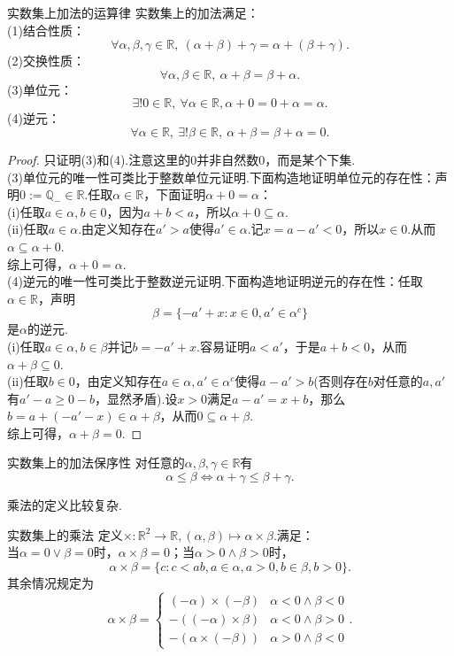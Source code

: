 \documentclass[lang=cn, zihao=5]{elegantbook}
\newcommand{\R}{\mathbb{R}}
\begin{document}
\begin{proposition}{实数集上加法的运算律}
	实数集上的加法满足： \\
	(1)结合性质：$$\forall \alpha ,\beta ,\gamma \in \R ,~(\alpha + \beta ) + \gamma = \alpha + (\beta + \gamma).$$
	(2)交换性质：$$\forall \alpha ,\beta \in \R,~\alpha + \beta = \beta + \alpha .$$
	(3)单位元：$$\exists ! 0 \in \R ,~\forall \alpha \in \R , \alpha + 0 = 0 + \alpha = \alpha .$$
	(4)逆元：$$\forall \alpha \in \R ,~\exists ! \beta \in \R ,~\alpha + \beta = \beta + \alpha = 0.$$
\end{proposition}
\begin{proof}
	只证明(3)和(4).注意这里的$0$并非自然数$0$，而是某个下集. \\
	(3)单位元的唯一性可类比于整数单位元证明.下面构造地证明单位元的存在性：声明$0 := \mathbb{Q}_{-} \in \R$.任取$\alpha \in \R$，下面证明$\alpha + 0 = \alpha$： \\
	(i)任取$a \in \alpha ,b \in 0$，因为$a + b < a$，所以$\alpha + 0 \subseteq \alpha$. \\
	(ii)任取$a \in \alpha$.由定义知存在$a'>a$使得$a' \in \alpha$.记$x=a-a'<0$，所以$x \in 0$.从而$\alpha \subseteq \alpha + 0$. \\
	综上可得，$\alpha +0 = \alpha$. \\
	(4)逆元的唯一性可类比于整数逆元证明.下面构造地证明逆元的存在性：任取$\alpha \in \R$，声明$$\beta = \{ -a'+x:x \in 0,a' \in \alpha ^c \}$$是$\alpha$的逆元. \\
	(i)任取$a \in \alpha ,b \in \beta$并记$b=-a'+x$.容易证明$a<a'$，于是$a+b <0$，从而$\alpha + \beta \subseteq 0$. \\
	(ii)任取$b \in 0$，由定义知存在$a \in \alpha ,a' \in \alpha ^c$使得$a - a'>b$(否则存在$b$对任意的$a,a'$有$a'-a \geq 0-b$，显然矛盾).设$x>0$满足$a-a'=x+b$，那么$b=a+(-a'-x) \in \alpha + \beta$，从而$0 \subseteq \alpha + \beta$. \\
	综上可得，$\alpha + \beta = 0$.
\end{proof}

\begin{proposition}{实数集上的加法保序性}
	对任意的$\alpha ,\beta ,\gamma \in \R$有$$\alpha \leq \beta \Leftrightarrow \alpha + \gamma \leq \beta + \gamma .$$
\end{proposition}

乘法的定义比较复杂.

\begin{definition}{实数集上的乘法}
	定义$\times :\R ^2 \to \R ,(\alpha ,\beta) \mapsto \alpha \times \beta$.满足： \\
	当$\alpha = 0 \vee \beta = 0$时，$\alpha \times \beta =0$；当$\alpha >0 \wedge \beta >0$时，$$\alpha \times \beta = \{ c:c<ab,a \in \alpha ,a>0,b \in \beta ,b>0 \}.$$
	其余情况规定为$$\alpha \times \beta = \begin{cases}
		(-\alpha) \times (-\beta)  & \alpha < 0 \wedge \beta < 0 \\
		-((-\alpha) \times \beta)  & \alpha < 0 \wedge \beta > 0 \\
		-(\alpha \times (-\beta))  & \alpha > 0 \wedge \beta < 0
	\end{cases}.$$
\end{definition}
\end{document}
